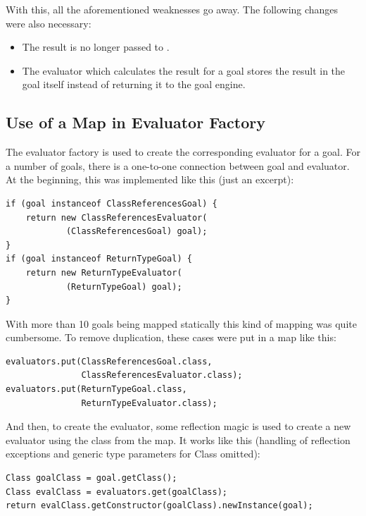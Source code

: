 \documentclass[12pt,halfparskip,DIV11,BCOR10mm]{scrreprt}
\begin{document}
With this, all the aforementioned weaknesses go away. The following changes were also necessary:

\begin{itemize}
    \item The result is no longer passed to .
    \item The evaluator which calculates the result for a goal stores the result in the goal itself instead of returning it to the goal engine.
\end{itemize}


\subsection{Use of a Map in Evaluator Factory}


The evaluator factory is used to create the corresponding evaluator for a goal. For a number of goals, there is a one-to-one connection between goal and evaluator. At the beginning, this was implemented like this (just an excerpt):

\begin{lstlisting}[style=java]
if (goal instanceof ClassReferencesGoal) {
    return new ClassReferencesEvaluator(
            (ClassReferencesGoal) goal);
}
if (goal instanceof ReturnTypeGoal) {
    return new ReturnTypeEvaluator(
            (ReturnTypeGoal) goal);
}
\end{lstlisting}

With more than 10 goals being mapped statically this kind of mapping was quite cumbersome. To remove duplication, these cases were put in a map like this:

\begin{lstlisting}[style=java]
evaluators.put(ClassReferencesGoal.class,
               ClassReferencesEvaluator.class);
evaluators.put(ReturnTypeGoal.class,
               ReturnTypeEvaluator.class);
\end{lstlisting}

And then, to create the evaluator, some reflection magic is used to create a new evaluator using the class from the map. It works like this (handling of reflection exceptions and generic type parameters for Class omitted):

\begin{lstlisting}[style=java]
Class goalClass = goal.getClass();
Class evalClass = evaluators.get(goalClass);
return evalClass.getConstructor(goalClass).newInstance(goal);
\end{lstlisting}
\end{document}
